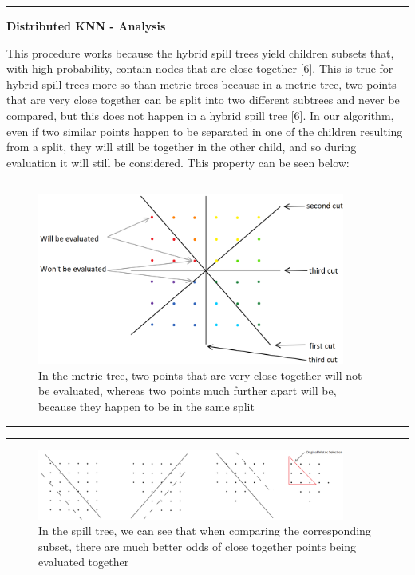 \noindent\rule{12.1cm}{0.4pt}

\vspace{5 mm}
\noindent
\textbf{Distributed KNN - Analysis}

\vspace{5 mm}
\noindent
This procedure works because the hybrid spill trees yield children subsets that,
with high probability, contain nodes that are close together [6].  This is true for 
hybrid spill trees more so than metric trees because in a metric tree, two points
that are very close together can be split into two different subtrees and never be
compared, but this does not happen in a hybrid spill tree [6].  In our algorithm, even
if two similar points happen to be separated in one of the children resulting from
a split, they will still be together in the other child, and so during evaluation 
it will still be considered.  This property can be seen below:

\vspace{5 mm}
\noindent\rule{12.1cm}{0.4pt}

\begin{figure}[ht!]
\centering
\includegraphics[width=0.9\textwidth]{metric}
\caption{In the metric tree, two points that are very close together will not 
be evaluated, whereas two points much further apart will be, because they 
happen to be in the same split}
\end{figure}

\noindent\rule{12.1cm}{0.4pt}

\newpage

\vspace{5 mm}
\noindent\rule{12.1cm}{0.4pt}

\begin{figure}[ht!]
\centering
\includegraphics[width=0.9\textwidth]{spill}
\caption{In the spill tree, we can see that when comparing the corresponding
subset, there are much better odds of close together points being evaluated
together}
\end{figure}

